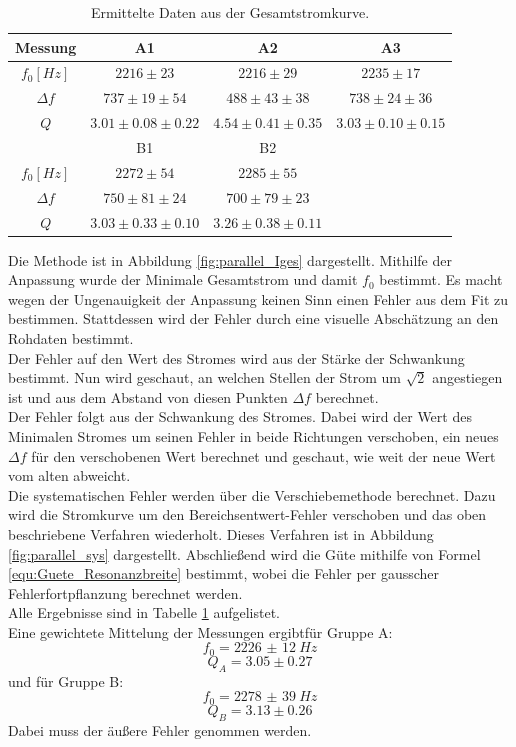 \documentclass[12pt,a4paper]{article}
\begin{document}
\begin{table}
\centering
\begin{tabular}{|c|c|c|c|}
\hline
Messung & A1 & A2 & A3\\
\hline
$f_0[Hz]$ & $2216\pm 23 $ & $2216\pm 29 $ & $2235\pm 17$\\
\hline
$\Delta f$ & $737\pm 19\pm 54$ & $488\pm 43\pm 38$ & $738\pm 24\pm 36$\\
\hline
$Q$ & $3.01\pm 0.08\pm 0.22 $ & $4.54\pm 0.41\pm 0.35 $ & $3.03\pm 0.10\pm 0.15$\\
\hline
\hline
 & B1 & B2 & \\
\hline
$f_0[Hz]$ & $2272\pm 54$ & $2285\pm 55$ &\\
\hline
$\Delta f$ & $750\pm 81\pm 24$ & $700\pm 79\pm 23$ &\\
\hline
$Q$ & $3.03\pm 0.33\pm 0.10$ & $3.26\pm 0.38\pm 0.11$ &\\
\hline
\end{tabular}
\caption{Ermittelte Daten aus der Gesamtstromkurve.}
\label{tab:parallel_methode1}
\end{table}

Die Methode ist in Abbildung \ref{fig:parallel_Iges} dargestellt.
Mithilfe der Anpassung wurde der Minimale Gesamtstrom und damit $f_0$ bestimmt. Es macht wegen der Ungenauigkeit der Anpassung keinen Sinn einen Fehler aus dem Fit zu bestimmen.  Stattdessen wird der Fehler durch eine visuelle Abschätzung an den Rohdaten bestimmt.\\
Der Fehler auf den Wert des Stromes wird aus der Stärke der Schwankung bestimmt.
Nun wird geschaut, an welchen Stellen der Strom um $\sqrt{2}$ angestiegen ist und aus dem Abstand von diesen Punkten $\Delta f$ berechnet.\\
Der Fehler folgt aus der Schwankung des Stromes. Dabei wird der Wert des Minimalen Stromes um seinen Fehler in beide Richtungen verschoben, ein neues $\Delta f$ für den verschobenen Wert berechnet und geschaut, wie weit der neue Wert vom alten abweicht.\\
Die systematischen Fehler werden über die Verschiebemethode berechnet. Dazu wird die Stromkurve um den Bereichsentwert-Fehler verschoben und das oben beschriebene Verfahren wiederholt. Dieses Verfahren ist in Abbildung \ref{fig:parallel_sys} dargestellt.
Abschließend wird die Güte mithilfe von Formel \ref{equ:Guete_Resonanzbreite} bestimmt, wobei die Fehler per gausscher Fehlerfortpflanzung berechnet werden.\\
Alle Ergebnisse sind in Tabelle \ref{tab:parallel_methode1} aufgelistet.\\
Eine gewichtete Mittelung der Messungen ergibtfür Gruppe A:
\begin{equation}
f_0 = \SI{2226(12)}{Hz}
\end{equation}
\begin{equation}
Q_A = 3.05\pm 0.27 
\end{equation}
und für Gruppe B:
\begin{equation}
f_0 = \SI{2278(39)}{Hz}
\end{equation}
\begin{equation}
Q_B = 3.13\pm 0.26 
\end{equation}
Dabei muss der äußere Fehler genommen werden.
\newpage
\end{document}

